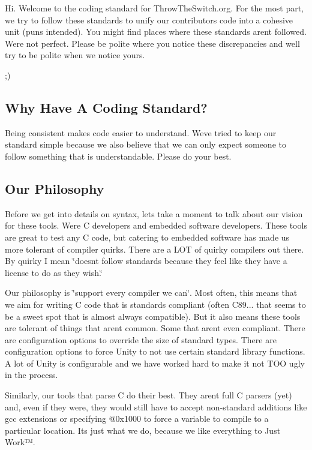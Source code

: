 Hi. Welcome to the coding standard for Throw\+The\+Switch.\+org. For the most part, we try to follow these standards to unify our contributors\textquotesingle{} code into a cohesive unit (puns intended). You might find places where these standards aren\textquotesingle{}t followed. We\textquotesingle{}re not perfect. Please be polite where you notice these discrepancies and we\textquotesingle{}ll try to be polite when we notice yours.

;)

\subsection*{Why Have A Coding Standard?}

Being consistent makes code easier to understand. We\textquotesingle{}ve tried to keep our standard simple because we also believe that we can only expect someone to follow something that is understandable. Please do your best.

\subsection*{Our Philosophy}

Before we get into details on syntax, let\textquotesingle{}s take a moment to talk about our vision for these tools. We\textquotesingle{}re C developers and embedded software developers. These tools are great to test any C code, but catering to embedded software has made us more tolerant of compiler quirks. There are a L\+OT of quirky compilers out there. By quirky I mean \char`\"{}doesn\textquotesingle{}t follow standards because they feel like
they have a license to do as they wish.\char`\"{}

Our philosophy is \char`\"{}support every compiler we can\char`\"{}. Most often, this means that we aim for writing C code that is standards compliant (often C89... that seems to be a sweet spot that is almost always compatible). But it also means these tools are tolerant of things that aren\textquotesingle{}t common. Some that aren\textquotesingle{}t even compliant. There are configuration options to override the size of standard types. There are configuration options to force Unity to not use certain standard library functions. A lot of Unity is configurable and we have worked hard to make it not T\+OO ugly in the process.

Similarly, our tools that parse C do their best. They aren\textquotesingle{}t full C parsers (yet) and, even if they were, they would still have to accept non-\/standard additions like gcc extensions or specifying {\ttfamily @0x1000} to force a variable to compile to a particular location. It\textquotesingle{}s just what we do, because we like everything to Just Work™.

